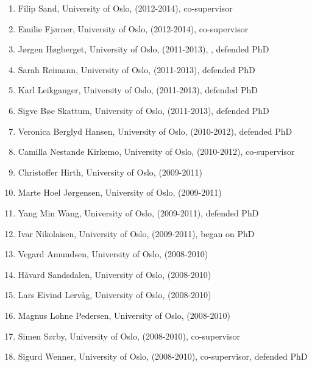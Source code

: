 \documentclass[aps,floatfix,preprint]{revtex4-1}
\begin{document}
\begin{enumerate}
\item Filip Sand, University of Oslo, (2012-2014), co-supervisor

\item Emilie Fjørner, University of Oslo, (2012-2014), co-supervisor

\item Jørgen Høgberget, University of Oslo, (2011-2013), , defended PhD

\item Sarah Reimann, University of Oslo, (2011-2013), defended PhD

\item Karl Leikganger, University of Oslo, (2011-2013), defended PhD

\item Sigve Bøe Skattum, University of Oslo, (2011-2013), defended PhD

\item Veronica Berglyd Hansen, University of Oslo, (2010-2012), defended PhD

\item Camilla Nestande Kirkemo, University of Oslo, (2010-2012), co-supervisor

\item Christoffer Hirth, University of Oslo, (2009-2011)

\item Marte Hoel Jørgensen, University of Oslo, (2009-2011)

\item Yang Min Wang, University of Oslo, (2009-2011), defended PhD

\item Ivar Nikolaisen, University of Oslo, (2009-2011), began on PhD

\item Vegard Amundsen, University of Oslo, (2008-2010)

\item Håvard Sandsdalen, University of Oslo, (2008-2010)

\item Lars Eivind Lervåg, University of Oslo, (2008-2010)

\item Magnus Lohne Pedersen, University of Oslo, (2008-2010)

\item Simen Sørby, University of Oslo, (2008-2010), co-supervisor

\item Sigurd Wenner, University of Oslo, (2008-2010), co-supervisor, defended PhD


\end{enumerate}
\end{document}
